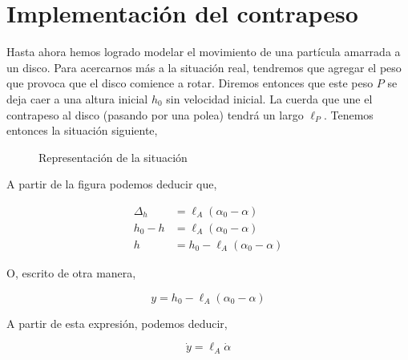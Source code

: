 \documentclass[10pt]{article}
\begin{document}
\section{Implementación del contrapeso}

Hasta ahora hemos logrado modelar el movimiento de una partícula amarrada a un disco. Para acercarnos más a la situación real, tendremos que agregar
el peso que provoca que el disco comience a rotar. Diremos entonces que este peso $P$ se deja caer a una altura inicial $h_0$ sin velocidad inicial. La
cuerda que une el contrapeso al disco (pasando por una polea) tendrá un largo $\ell_P$. Tenemos entonces la situación siguiente,

\begin{figure}[h]
\centering
{}
\caption{Representación de la situación}
\end{figure}

A partir de la figura podemos deducir que,

\begin{align*}
 \Delta_h &= \ell_A(\alpha_0-\alpha) \\
 h_0-h &= \ell_A(\alpha_0-\alpha) \\
 h &= h_0-\ell_A(\alpha_0-\alpha)
\end{align*}

O, escrito de otra manera,

\begin{equation}
 y = h_0 - \ell_A(\alpha_0-\alpha)
\end{equation}

A partir de esta expresión, podemos deducir,

\begin{equation*}
 \dot{y} = \ell_A\dot{\alpha}
\end{equation*}
\end{document}

